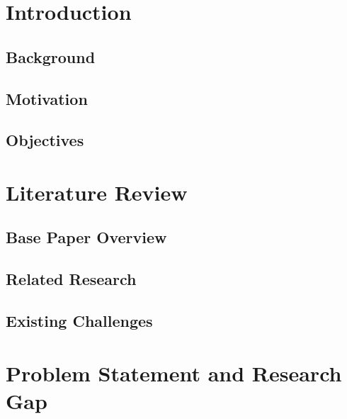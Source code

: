 \documentclass[12pt]{report}
\begin{document}
\tableofcontents
\newpage

\chapter{Introduction}

\section{Background}

\section{Motivation}

\section{Objectives}

\chapter{Literature Review}

\section{Base Paper Overview}

\section{Related Research}

\section{Existing Challenges}

\chapter{Problem Statement and Research Gap}
\end{document}
